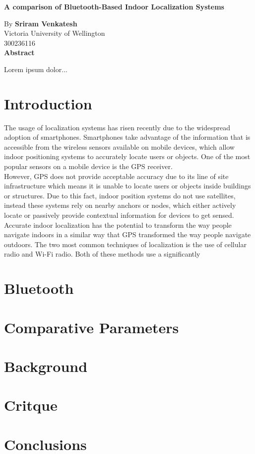 \documentclass[12pt]{article}
\begin{document}
\begin{titlepage}
\begin{center}
	\Huge
	\textbf{A comparison of Bluetooth-Based Indoor Localization Systems} \\
	\large    

	\vspace{0.5cm}
	By \textbf{Sriram Venkatesh}\\
	Victoria University of Wellington\\
	300236116 \\

	\vspace{0.9cm}
	\textbf{Abstract}
\end{center}
\doublespacing
	Lorem ipsum dolor...


\end{titlepage}

\doublespacing
\section*{Introduction}
The usage of localization systems has risen recently due to the widespread adoption of smartphones. Smartphones take advantage of the information that is accessible from the wireless sensors available on mobile devices, which allow indoor positioning systems to accurately locate users or objects. One of the most popular sensors on a mobile device is the GPS receiver. \cite{HABITS} \\

However, GPS does not provide acceptable accuracy due to its line of site infrastructure \cite{fusionmethod} which means it is unable to locate users or objects inside buildings or structures. Due to this fact, indoor position systems do not use satellites, instead these systems rely on nearby anchors or nodes, which either actively locate or passively provide contextual information for devices to get sensed. \\

Accurate indoor localization has the potential to transform the way people navigate indoors in a similar way that GPS transformed the way people navigate outdoors. The two most common techniques of localization is the use of cellular radio and Wi-Fi radio. Both of these methods use a significantly 

\section*{Bluetooth}


\section*{Comparative Parameters}


\section*{Background}


\section*{Critque}


\section*{Conclusions}



\nocite{*}
\end{document}

